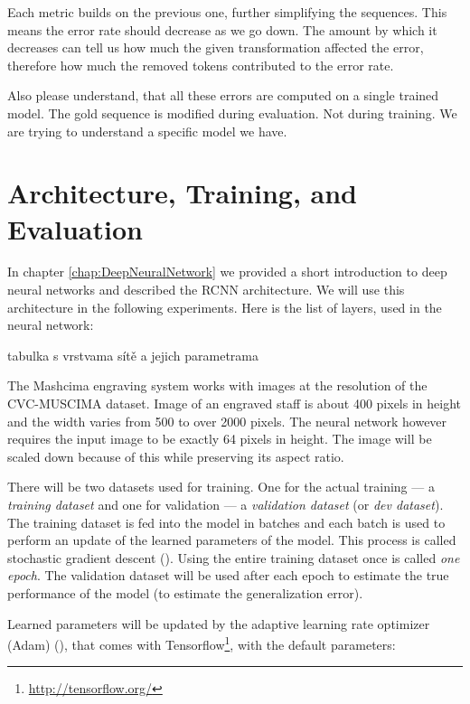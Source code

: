 Each metric builds on the previous one, further simplifying the sequences. This means the error rate should decrease as we go down. The amount by which it decreases can tell us how much the given transformation affected the error, therefore how much the removed tokens contributed to the error rate.

Also please understand, that all these errors are computed on a single trained model. The gold sequence is modified during evaluation. Not during training. We are trying to understand a specific model we have.


\section{Architecture, Training, and Evaluation}
\label{sec:ArchitectureTrainingEvaluation}

In chapter \ref{chap:DeepNeuralNetwork} we provided a short introduction to deep neural networks and described the RCNN architecture. We will use this architecture in the following experiments. Here is the list of layers, used in the neural network:

\begin{code}
tabulka s vrstvama sítě a jejich parametrama
\end{code}

The Mashcima engraving system works with images at the resolution of the CVC-MUSCIMA dataset. Image of an engraved staff is about 400 pixels in height and the width varies from 500 to over 2000 pixels. The neural network however requires the input image to be exactly 64 pixels in height. The image will be scaled down because of this while preserving its aspect ratio.

There will be two datasets used for training. One for the actual training --- a \emph{training dataset} and one for validation --- a \emph{validation dataset} (or \emph{dev dataset}). The training dataset is fed into the model in batches and each batch is used to perform an update of the learned parameters of the model. This process is called stochastic gradient descent (\cite{Goodfellow-et-al-2016}). Using the entire training dataset once is called \emph{one epoch}. The validation dataset will be used after each epoch to estimate the true performance of the model (to estimate the generalization error).

Learned parameters will be updated by the adaptive learning rate optimizer (Adam) (\cite{AdamOptimizer}), that comes with Tensorflow\footnote{\href{http://tensorflow.org/}{http://tensorflow.org/}}, with the default parameters:

